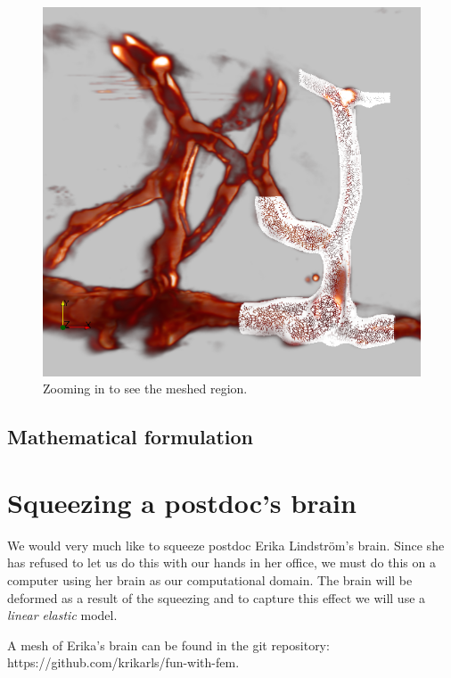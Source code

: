 \documentclass[epsfig,11pt]{article}
\begin{document}
\begin{figure}[h!] 
\begin{center}
  \includegraphics[scale=0.3]{zoomed2.png}
  \end{center}
  \caption{Zooming in to see the meshed region.}
\end{figure}

\subsection{Mathematical formulation}


\section{Squeezing a postdoc's brain}

We would very much like to squeeze postdoc Erika Lindström's brain. Since she has refused to let us do this with our hands in her office, we must do this on a computer using her brain as our computational domain. The brain will be deformed as a result of the squeezing and to capture this effect we will use a \emph{linear elastic} model. 

A mesh of Erika's brain can be found in the git repository:
 https://github.com/krikarls/fun-with-fem. 
 
\end{document}
